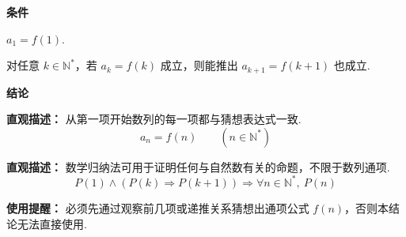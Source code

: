 \begin{statementbox}
	\textbf{\textcolor{CStatement}{条件}}
	\begin{description}[style=nextline, leftmargin=2.8em, labelsep=0.5em, itemsep=0.35em]
		\item[\textbf{\textcolor{CStatement}{条件1（初值满足）：}}] $a_1 = f(1)$.
		\item[\textbf{\textcolor{CStatement}{条件2（递推保持）：}}] 对任意 $k\in\mathbb{N}^*$，若 $a_k = f(k)$ 成立，则能推出 $a_{k+1} = f(k+1)$ 也成立.
	\end{description}

	\textbf{\textcolor{CStatement}{结论}}
	\begin{description}[style=nextline, leftmargin=2.8em, labelsep=0.5em, itemsep=0.45em]
		\item[\textbf{\textcolor{CStatement}{结论一（通项恒等）：}}]
			\textbf{\textcolor{CStatement}{直观描述：}}
			从第一项开始数列的每一项都与猜想表达式一致.
			\[
				a_n = f(n)
				\qquad
				(n \in \mathbb{N}^*)
			\]

		\item[\textbf{\textcolor{CStatement}{推广结论（一般归纳原理）：}}]
			\textbf{\textcolor{CStatement}{直观描述：}}
			数学归纳法可用于证明任何与自然数有关的命题，不限于数列通项.
			\[
				P(1) \land (P(k) \Rightarrow P(k+1)) \Rightarrow \forall n\in\mathbb{N}^*,\ P(n)
			\]
	\end{description}

	\textbf{\textcolor{CStatement}{使用提醒：}}
	必须先通过观察前几项或递推关系猜想出通项公式 $f(n)$，否则本结论无法直接使用.
\end{statementbox}
